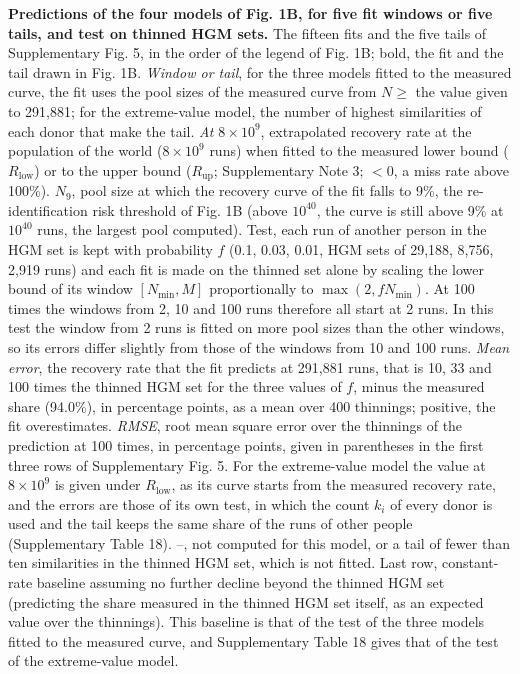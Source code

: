 \documentclass[11pt,a4paper]{article}
\begin{document}
\setcounter{table}{15}
\begin{table}[!htbp]\centering\small\setlength{\tabcolsep}{3.8pt}
\caption[Predictions of the four models of Fig. 1B, for five fit windows or five tails, and test on thinned HGM sets]{\textbf{Predictions of the four models of Fig. 1B, for five fit windows or five tails, and test on thinned HGM sets.} The fifteen fits and the five tails of Supplementary Fig. 5, in the order of the legend of Fig. 1B; bold, the fit and the tail drawn in Fig. 1B. \textit{Window or tail}, for the three models fitted to the measured curve, the fit uses the pool sizes of the measured curve from $N \ge$ the value given to 291,881; for the extreme-value model, the number of highest similarities of each donor that make the tail. \textit{At $8\times10^9$}, extrapolated recovery rate at the population of the world ($8\times10^9$ runs) when fitted to the measured lower bound ($R_{\mathrm{low}}$) or to the upper bound ($R_{\mathrm{up}}$; Supplementary Note 3; $<$0, a miss rate above 100\%). $N_9$, pool size at which the recovery curve of the fit falls to 9\%, the re-identification risk threshold of Fig. 1B (above $10^{40}$, the curve is still above 9\% at $10^{40}$ runs, the largest pool computed). Test, each run of another person in the HGM set is kept with probability $f$ (0.1, 0.03, 0.01, HGM sets of 29,188, 8,756, 2,919 runs) and each fit is made on the thinned set alone by scaling the lower bound of its window $[N_{\min}, M]$ proportionally to $\max(2, f N_{\min})$. At 100 times the windows from 2, 10 and 100 runs therefore all start at 2 runs. In this test the window from 2 runs is fitted on more pool sizes than the other windows, so its errors differ slightly from those of the windows from 10 and 100 runs. \textit{Mean error}, the recovery rate that the fit predicts at 291,881 runs, that is 10, 33 and 100 times the thinned HGM set for the three values of $f$, minus the measured share (94.0\%), in percentage points, as a mean over 400 thinnings; positive, the fit overestimates. \textit{RMSE}, root mean square error over the thinnings of the prediction at 100 times, in percentage points, given in parentheses in the first three rows of Supplementary Fig. 5. For the extreme-value model the value at $8\times10^9$ is given under $R_{\mathrm{low}}$, as its curve starts from the measured recovery rate, and the errors are those of its own test, in which the count $k_i$ of every donor is used and the tail keeps the same share of the runs of other people (Supplementary Table 18). --, not computed for this model, or a tail of fewer than ten similarities in the thinned HGM set, which is not fitted. Last row, constant-rate baseline assuming no further decline beyond the thinned HGM set (predicting the share measured in the thinned HGM set itself, as an expected value over the thinnings). This baseline is that of the test of the three models fitted to the measured curve, and Supplementary Table 18 gives that of the test of the extreme-value model.}

\end{table}
\end{document}
